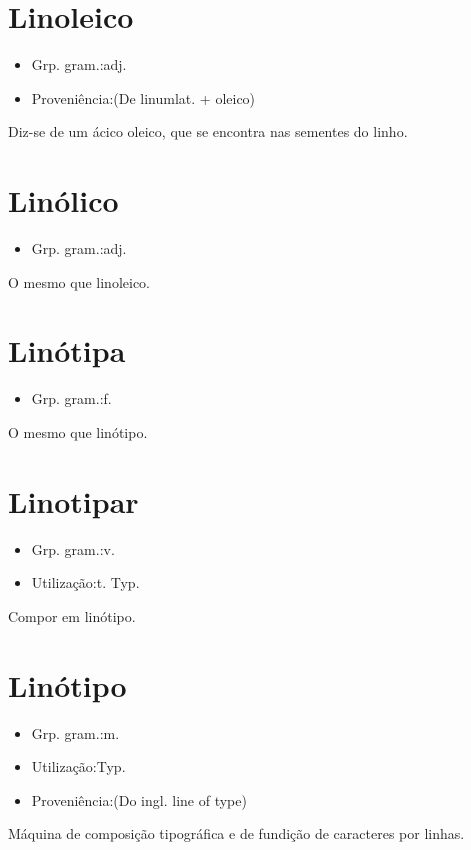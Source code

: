 \section{Linoleico}
\begin{itemize}
\item {Grp. gram.:adj.}
\end{itemize}
\begin{itemize}
\item {Proveniência:(De \textunderscore linum\textunderscore  lat. + \textunderscore oleico\textunderscore )}
\end{itemize}
Diz-se de um ácico oleico, que se encontra nas sementes do linho.
\section{Linólico}
\begin{itemize}
\item {Grp. gram.:adj.}
\end{itemize}
O mesmo que \textunderscore linoleico\textunderscore .
\section{Linótipa}
\begin{itemize}
\item {Grp. gram.:f.}
\end{itemize}
O mesmo que \textunderscore linótipo\textunderscore .
\section{Linotipar}
\begin{itemize}
\item {Grp. gram.:v.}
\end{itemize}
\begin{itemize}
\item {Utilização:t. Typ.}
\end{itemize}
Compor em linótipo.
\section{Linótipo}
\begin{itemize}
\item {Grp. gram.:m.}
\end{itemize}
\begin{itemize}
\item {Utilização:Typ.}
\end{itemize}
\begin{itemize}
\item {Proveniência:(Do ingl. \textunderscore line of type\textunderscore )}
\end{itemize}
Máquina de composição tipográfica e de fundição de caracteres por linhas.
